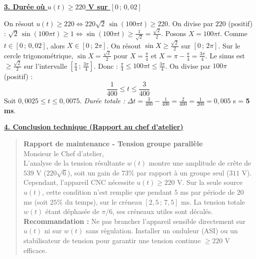 \documentclass[11pt]{article}
\begin{document}
\begin{exoresolu}
\bigskip
\underline{\textbf{3. Durée où $u(t) \geq 220$ V sur $[0\,;\, 0,02]$}}

On résout $u(t) \geq 220 \Leftrightarrow 220\sqrt{2}\,\sin(100\pi t) \geq 220$.
On divise par $220$ (positif) : $\sqrt{2}\,\sin(100\pi t) \geq 1 \Leftrightarrow \sin(100\pi t) \geq \frac{1}{\sqrt{2}} = \frac{\sqrt{2}}{2}$.
Posons $X = 100\pi t$. Comme $t \in [0\,;\, 0,02]$, alors $X \in [0\,;\, 2\pi]$.
On résout $\sin X \geq \frac{\sqrt{2}}{2}$ sur $[0\,;\, 2\pi]$.
Sur le cercle trigonométrique, $\sin X = \frac{\sqrt{2}}{2}$ pour $X = \frac{\pi}{4}$ et $X = \pi - \frac{\pi}{4} = \frac{3\pi}{4}$.
Le sinus est $\geq \frac{\sqrt{2}}{2}$ sur l'intervalle $\left[ \frac{\pi}{4}\,;\, \frac{3\pi}{4} \right]$.
Donc : $\frac{\pi}{4} \leq 100\pi t \leq \frac{3\pi}{4}$.
On divise par $100\pi$ (positif) :
\[ \frac{1}{400} \leq t \leq \frac{3}{400} \]
Soit $0,0025 \leq t \leq 0,0075$.
\emph{Durée totale :} $\Delta t = \frac{3}{400} - \frac{1}{400} = \frac{2}{400} = \frac{1}{200} = 0,005$ s = \textbf{5 ms}.

\bigskip
\underline{\textbf{4. Conclusion technique (Rapport au chef d'atelier)}}

\begin{quote}
\textbf{Rapport de maintenance - Tension groupe parallèle}\\
Monsieur le Chef d'atelier,\\
L'analyse de la tension résultante $w(t)$ montre une amplitude de crête de $539$ V ($220\sqrt{6}$), soit un gain de $73\%$ par rapport à un groupe seul ($311$ V). Cependant, l'appareil CNC nécessite $u(t) \geq 220$ V. Sur la seule source $u(t)$, cette condition n'est remplie que pendant $5$ ms par période de $20$ ms (soit $25\%$ du temps), sur le créneau $[2,5\,;\, 7,5]$ ms. La tension totale $w(t)$ étant déphasée de $\pi/6$, ses créneaux utiles sont décalés.\\
\textbf{Recommandation :} Ne pas brancher l'appareil sensible directement sur $u(t)$ ni sur $w(t)$ sans régulation. Installer un onduleur (ASI) ou un stabilisateur de tension pour garantir une tension continue $\geq 220$ V efficace.
\end{quote}
\end{exoresolu}
\end{document}

